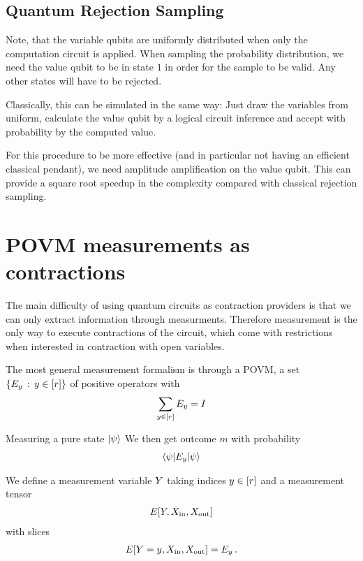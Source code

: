 \documentclass[aps,onecolumn,nofootinbib,pra]{article}
\begin{document}
    \subsection{Quantum Rejection Sampling}

    Note, that the variable qubits are uniformly distributed when only the computation circuit is applied.
    When sampling the probability distribution, we need the value qubit to be in state $1$ in order for the sample to be valid.
    Any other states will have to be rejected.

    Classically, this can be simulated in the same way: Just draw the variables from uniform, calculate the value qubit by a logical circuit inference and accept with probability by the computed value.

    For this procedure to be more effective (and in particular not having an efficient classical pendant), we need amplitude amplification on the value qubit.
    This can provide a square root speedup in the complexity compared with classical rejection sampling.


    \section{POVM measurements as contractions}

    The main difficulty of using quantum circuits as contraction providers is that we can only extract information through measurments.
    Therefore measurement is the only way to execute contractions of the circuit, which come with restrictions when interested in contraction with open variables.

    The most general measurement formalism is through a POVM, a set $\{E_y \, : \, y\in[r]\}$ of positive operators with %
    \begin{align*}
        \sum_{y\in[r]} E_y = I
    \end{align*}

    Measuring a pure state $\ket{\psi}$ We then get outcome $m$ with probability
    \begin{align*}
        \braket{\psi|E_y|\psi}
    \end{align*}

    We define a measurement variable $Y$ taking indices $y\in[r]$ and a measurement tensor
    \begin{align*}
        E[Y,X_{\mathrm{in}},X_{\mathrm{out}}]
    \end{align*}
    with slices
    \begin{align*}
        E[Y=y,X_{\mathrm{in}},X_{\mathrm{out}}] = E_y \, .
    \end{align*}
\end{document}
